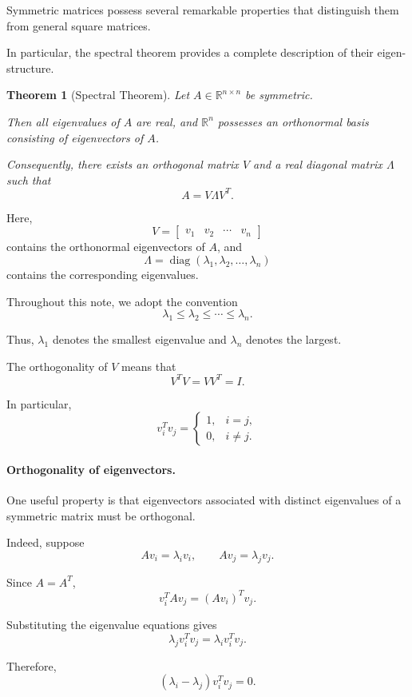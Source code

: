 \documentclass[14pt,letterpaper]{article}
\theoremstyle{plain}
\newtheorem{theorem}{Theorem}[section]
\theoremstyle{definition}
\theoremstyle{remark}
\newcommand{\R}{\mathbb{R}}
\DeclareMathOperator{\diag}{diag}
\begin{document}
Symmetric matrices possess several remarkable
properties that distinguish them from general
square matrices.

In particular, the spectral theorem provides
a complete description of their eigen-structure.

\begin{theorem}[Spectral Theorem]
Let $A\in\R^{n\times n}$ be symmetric.

Then all eigenvalues of $A$ are real, and
$\R^n$ possesses an orthonormal basis consisting
of eigenvectors of $A$.

Consequently, there exists an orthogonal matrix
$V$ and a real diagonal matrix $\Lambda$ such that
\[
\boxed{
A=V\Lambda V^T.
}
\]
\end{theorem}

Here,
\[
V=
\begin{bmatrix}
v_1 & v_2 & \cdots & v_n
\end{bmatrix}
\]
contains the orthonormal eigenvectors of $A$, and
\[
\Lambda=
\diag(\lambda_1,\lambda_2,\ldots,\lambda_n)
\]
contains the corresponding eigenvalues.

Throughout this note, we adopt the convention
\[
\boxed{
\lambda_1\leq\lambda_2\leq\cdots\leq\lambda_n.
}
\]

Thus, $\lambda_1$ denotes the smallest eigenvalue
and $\lambda_n$ denotes the largest.

The orthogonality of $V$ means that
\[
V^TV=VV^T=I.
\]

In particular,
\[
v_i^Tv_j=
\begin{cases}
1, & i=j,\\
0, & i\neq j.
\end{cases}
\]

\paragraph{Orthogonality of eigenvectors.}

One useful property is that eigenvectors associated
with distinct eigenvalues of a symmetric matrix
must be orthogonal.

Indeed, suppose
\[
Av_i=\lambda_i v_i,
\qquad
Av_j=\lambda_j v_j.
\]

Since $A=A^T$,
\[
v_i^TAv_j=(Av_i)^Tv_j.
\]

Substituting the eigenvalue equations gives
\[
\lambda_j v_i^Tv_j
=
\lambda_i v_i^Tv_j.
\]

Therefore,
\[
(\lambda_i-\lambda_j)v_i^Tv_j=0.
\]
\end{document}
